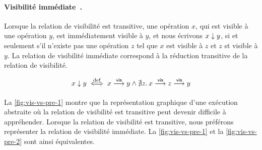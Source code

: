 \paragraph{Visibilité immédiate~\autocite{hernandez2003immediate,hernandez2015minimal}.}
Lorsque la relation de visibilité est transitive, une opération $x$, qui est visible à une opération $y$, est immédiatement visible à $y$, et nous écrivons $x \downarrow y$, si et seulement s'il n'existe pas une opération $z$ tel que $x$ est visible à $z$ et $z$ st visible à $y$.
La relation de visibilité immédiate correspond à la réduction transitive de la relation de visibilité.

\begin{equation*}
    x \downarrow y \overset{\mathrm{def}}{\iff} x \overset{\mathsf{vis}}{\longrightarrow} y \land \nexists z \ldotp x \overset{\mathsf{vis}}{\longrightarrow} z \overset{\mathsf{vis}}{\longrightarrow} y
\end{equation*}

\paragraph{} La \autoref{fig:vis-vs-pre-1} montre que la représentation graphique d'une exécution abstraite où la relation de visibilité est transitive peut devenir difficile à appréhender.
Lorsque la relation de visibilité est transitive, nous préférons représenter la relation de visibilité immédiate.
La \autoref{fig:vis-vs-pre-1} et la \autoref{fig:vis-vs-pre-2} sont ainsi équivalentes.

